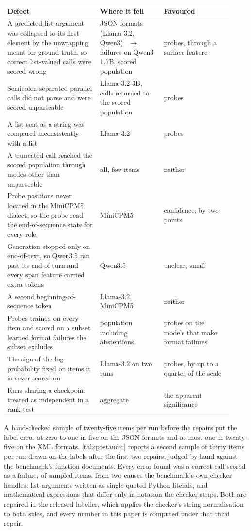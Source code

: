 \begin{center}\small
\begin{tabular}{p{0.38\linewidth}p{0.26\linewidth}p{0.28\linewidth}}
\toprule
Defect & Where it fell & Favoured \\
\midrule
A predicted list argument was collapsed to its first element by the unwrapping meant for ground truth, so correct list-valued calls were scored wrong & JSON formats (Llama-3.2, Qwen3). \repPosBeforeQwenThreeBfcl{}\,$\to$\,\repPosAfterQwenThreeBfcl{} failures on Qwen3-1.7B, scored population & probes, through a surface feature \\
Semicolon-separated parallel calls did not parse and were scored unparseable & Llama-3.2-3B, \repParallelLlamaThreeBBfcl{} calls returned to the scored population & probes \\
A list sent as a string was compared inconsistently with a list & Llama-3.2 & probes \\
A truncated call reached the scored population through modes other than unparseable & all, few items & neither \\
Probe positions never located in the MiniCPM5 dialect, so the probe read the end-of-sequence state for every role & MiniCPM5 & confidence, by two points \\
Generation stopped only on end-of-text, so Qwen3.5 ran past its end of turn and every span feature carried extra tokens & Qwen3.5 & unclear, small \\
A second beginning-of-sequence token & Llama-3.2, MiniCPM5 & neither \\
Probes trained on every item and scored on a subset learned format failures the subset excludes & population including abstentions & probes on the models that make format failures \\
The sign of the log-probability fixed on items it is never scored on & Llama-3.2 on two runs & probes, by up to a quarter of the scale \\
Runs sharing a checkpoint treated as independent in a rank test & aggregate & the apparent significance \\
\bottomrule
\end{tabular}
\end{center}

A hand-checked sample of twenty-five items per run before the repairs put the label error at zero to one in five on the JSON formats and at most one in twenty-five on the XML formats. \cref{tab:postaudit} reports a second sample of thirty items per run drawn on the labels after the first two
repairs, judged by hand against the benchmark's function documents. Every error found was a correct call scored
as a failure, \auditPooledErr{} of \auditPooledN{} sampled items, from two causes the benchmark's own checker
handles: list arguments written as single-quoted Python literals, and mathematical expressions that differ only
in notation the checker strips. Both are repaired in the released labeller, which applies the checker's string
normalisation to both sides, and every number in this paper is computed under that third repair.

